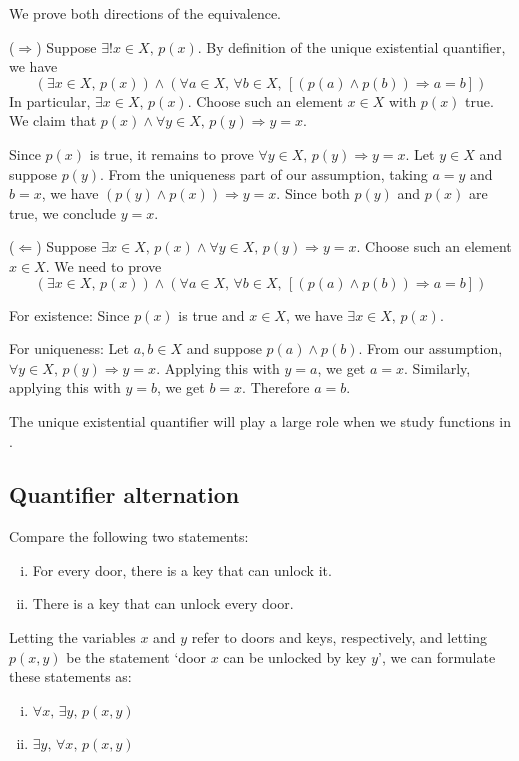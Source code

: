 \begin{cproof}
We prove both directions of the equivalence.

($\Rightarrow$) Suppose $\exists ! x \in X,\, p(x)$. By definition of the unique existential quantifier, we have
\[(\exists x \in X,\, p(x)) \wedge (\forall a \in X,\, \forall b \in X,\, [(p(a) \wedge p(b)) \Rightarrow a=b])\]
In particular, $\exists x \in X,\, p(x)$. Choose such an element $x \in X$ with $p(x)$ true. We claim that $p(x) \wedge \forall y \in X,\, p(y) \Rightarrow y = x$.

Since $p(x)$ is true, it remains to prove $\forall y \in X,\, p(y) \Rightarrow y = x$. Let $y \in X$ and suppose $p(y)$. From the uniqueness part of our assumption, taking $a = y$ and $b = x$, we have $(p(y) \wedge p(x)) \Rightarrow y = x$. Since both $p(y)$ and $p(x)$ are true, we conclude $y = x$.

($\Leftarrow$) Suppose $\exists x \in X,\, p(x) \wedge \forall y \in X,\, p(y) \Rightarrow y = x$. Choose such an element $x \in X$. We need to prove
\[(\exists x \in X,\, p(x)) \wedge (\forall a \in X,\, \forall b \in X,\, [(p(a) \wedge p(b)) \Rightarrow a=b])\]

For existence: Since $p(x)$ is true and $x \in X$, we have $\exists x \in X,\, p(x)$.

For uniqueness: Let $a, b \in X$ and suppose $p(a) \wedge p(b)$. From our assumption, $\forall y \in X,\, p(y) \Rightarrow y = x$. Applying this with $y = a$, we get $a = x$. Similarly, applying this with $y = b$, we get $b = x$. Therefore $a = b$.
\end{cproof}

The unique existential quantifier will play a large role when we study functions in .

\subsection*{Quantifier alternation}
Compare the following two statements:
\begin{enumerate}[(i)] 
\item For every door, there is a key that can unlock it.
\item There is a key that can unlock every door.
\end{enumerate}

Letting the variables $x$ and $y$ refer to doors and keys, respectively, and letting $p(x,y)$ be the statement `door $x$ can be unlocked by key $y$', we can formulate these statements as:
\begin{enumerate}[(i)] 
\item $\forall x,\, \exists y,\, p(x,y)$
\item $\exists y,\, \forall x,\, p(x,y)$
\end{enumerate}

